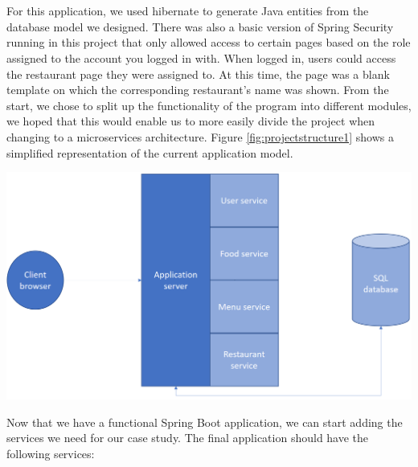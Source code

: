 \documentclass[12pt]{article}
\newenvironment{Figure}
	{\par\medskip\noindent\minipage{\linewidth}}
	{\endminipage\par\medskip}
\begin{document}
\begin{multicols}{2}
\\\\
For this application, we used hibernate to generate Java entities from the database model we designed. There was also a basic version of Spring Security running in this project that only allowed access to certain pages based on the role assigned to the account you logged in with. When logged in, users could access the restaurant page they were assigned to. At this time, the page was a blank template on which the corresponding restaurant's name was shown. From the start, we chose to split up the functionality of the program into different modules, we hoped that this would enable us to more easily divide the project when changing to a microservices architecture. Figure \ref{fig:projectstructure1} shows a simplified representation of the current application model.
\begin{Figure}
	\centering
	\includegraphics[width=\linewidth]{illustrations/projectstructure1.png}
	\label{fig:projectstructure1}
\end{Figure}
\noindent Now that we have a functional Spring Boot application, we can start adding the services we need for our case study. The final application should have the following services:


\end{multicols}
\end{document}
